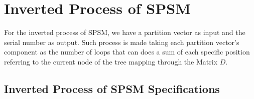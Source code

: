 \documentclass {amsart}
\begin{document}
\section*{Inverted Process of SPSM}

For the inverted process of SPSM, we have a partition vector as
input and the serial number as output. Such process is made taking
each partition vector's component as the number of loops that can
does a sum of each specific position referring to the current node
of the tree mapping through the Matrix {$D$}.

\subsection*{Inverted Process of SPSM Specifications}
\end{document}
